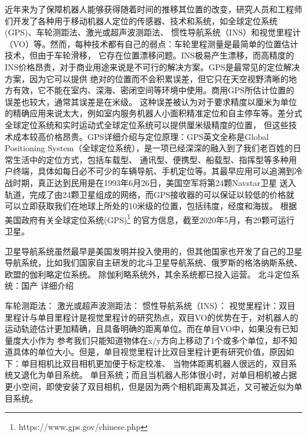 近年来为了保障机器人能够获得随着时间的推移其位置的改变，研究人员和工程师们开发了各种用于移动机器人定位的传感器、技术和系统，如全球定位系统(GPS)、车轮测距法、激光或超声波测距法、
惯性导航系统（INS）和视觉里程计（VO）等。然而，每种技术都有自己的弱点：车轮里程测量是最简单的位置估计技术，但由于车轮滑移，
它存在位置漂移问题\cite{2005Visual}。INS极易产生漂移，而高精度的INS价格昂贵，对于商业用途来说是不可行的解决方案。GPS是最常见的定位解决方案，因为它可以提供
绝对的位置而不会积累误差，但它只在天空视野清晰的地方有效，它不能在室内、深海、密闭空间等环境中使用\cite{2011Combined}。商用GPS所估计位置的误差也较大，通常其误差是在米级。
这种误差被认为对于要求精度以厘米为单位的精确应用来说太大，例如室内服务机器人小面积精准定位和自主停车等。差分式全球定位系统和实时运动式全球定位系统可以提供厘米级精度的位置，
但这些技术成本较高价格昂贵。GPS详细介绍与定位原理：GPS英文全称是Global Positioning System（全球定位系统），是一项已经深深的融入到了我们老百姓的日常生活中的定位方式，包括车载型、
通讯型、便携型、船载型、指挥型等多种用户终端，具体如每日必不可少的车辆导航、手机定位等。其最早应用可以追溯到冷战时期，真正达到民用是在1993年6月26日，美国空军将第24颗Navstar卫星
送入轨道，完成了由24颗卫星组成的网络，而GPS接收器的可以保证以较低的价格就可以立即获取我们在地球上所处的10米级的位置，包括纬度，经度和海拔。
根据美国政府有关全球定位系统(GPS)\footnote{https://www.gps.gov/chinese.php}
的官方信息，截至2020年5月，有29颗可运行卫星。

卫星导航系统虽然最早是美国发明并投入使用的，但其他国家也开发了自己的卫星导航系统，比如我们国家自主研发的北斗卫星导航系统、俄罗斯的格洛纳斯系统、欧盟的伽利略定位系统。
除伽利略系统外，其余系统都已投入运营。
北斗定位系统：国产 详细介绍

车轮测距法：
激光或超声波测距法：
惯性导航系统（INS）：
视觉里程计：双目里程计与单目里程计是视觉里程计的研究热点，双目VO的优势在于，对机器人的运动轨迹估计更加精确，且具备明确的距离单位。而在单目VO中，如果没有已知量度大小作为
参考我们只能知道物体在x/y方向上移动了1个或多个单位，却不知道具体的单位大小。但是，单目视觉里程计比双目里程计更有研究价值，原因如下：单目相机比双目相机更加便于标定校准、
当物体距离机器人很远的，双目系统又退化为单目系统。
单目系统；而且当机器人形体很小时，对单目相机被占据更小空间，即使安装了双目相机，但是因为两个相机距离及其近，又可被近似为单目系统。

